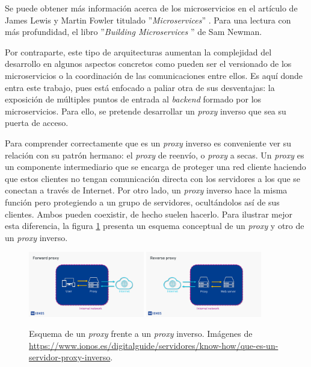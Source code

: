 \documentclass[11pt,spanish,listoffigures]{tfgetsinf}
\begin{document}
Se puede obtener más información acerca de los microservicios en el artículo de James Lewis y Martin Fowler titulado ''\emph{Microservices}'' \cite{LewisAndFowler}. Para una lectura con más profundidad, el libro ''\emph{Building Microservices} \cite{Newman}'' de Sam Newman.

Por contraparte, este tipo de arquitecturas aumentan la complejidad del desarrollo en algunos aspectos concretos como pueden ser el versionado de los microservicios o la coordinación de las comunicaciones entre ellos. Es aquí donde entra este trabajo, pues está enfocado a paliar otra de sus desventajas: la exposición de múltiples puntos de entrada al \emph{backend} formado por los microservicios. Para ello, se pretende desarrollar un \emph{proxy} inverso que sea su puerta de acceso.

Para comprender correctamente que es un \emph{proxy} inverso es conveniente ver su relación con su patrón hermano: el \emph{proxy} de reenvío, o \emph{proxy} a secas. Un \emph{proxy} es un componente intermediario que se encarga de proteger una red cliente haciendo que estos clientes no tengan comunicación directa con los servidores a los que se conectan a través de Internet. Por otro lado, un \emph{proxy} inverso hace la misma función pero protegiendo a un grupo de servidores, ocultándolos así de sus clientes. Ambos pueden coexistir, de hecho suelen hacerlo. Para ilustrar mejor esta diferencia, la figura \ref{figura:proxy_vs_proxyInverso} presenta un esquema conceptual de un \emph{proxy} y otro de un \emph{proxy} inverso.

\begin{figure}[ht]
	\centering
	\label{figura:proxy_vs_proxyInverso}
	\includegraphics[width=0.45\textwidth]{images/proxy}
	\includegraphics[width=0.45\textwidth]{images/proxyInverso}
	\caption{Esquema de un \emph{proxy} frente a un \emph{proxy} inverso. Imágenes de \url{https://www.ionos.es/digitalguide/servidores/know-how/que-es-un-servidor-proxy-inverso}.}
\end{figure}
\end{document}
